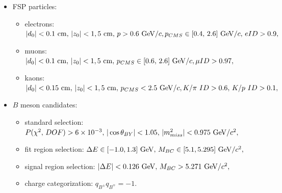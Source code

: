 \begin{itemize}
	\item FSP particles:
	\begin{itemize}
		\item electrons: $\vert d_0 \vert < 0.1\mathrm{~cm},\,\vert z_0 \vert < 1,5\mathrm{~cm},\,p>0.6\mathrm{~GeV}/c,\\p_{CMS}\in[0.4,\,2.6]\mathrm{~GeV}/c,\,eID>0.9,$
		\item muons: $\vert d_0 \vert < 0.1\mathrm{~cm},\,\vert z_0 \vert < 1,5\mathrm{~cm},\,p_{CMS}\in[0.6,\,2.6]\mathrm{~GeV}/c,\\\mu ID>0.97,$
		\item kaons: $\vert d_0 \vert < 0.15\mathrm{~cm},\,\vert z_0 \vert < 1,5\mathrm{~cm},\,p_{CMS} < 2.5\mathrm{~GeV}/c,\\K/\pi~ID>0.6,\,K/p~ID>0.1,$
	\end{itemize}
	\item $B$ meson candidates:
	\begin{itemize}
		\item standard selection: $P(\chi^2,\,DOF) > 6\times 10^{-3},\,\vert \cos \theta_{BY} \vert < 1.05,\,\vert m_{miss}^2\vert<0.975\mathrm{~GeV}/c^2,$
		\item fit region selection: $\Delta E \in [-1.0,1.3]\mathrm{~GeV},\,M_{BC} \in [5.1,5.295]\mathrm{~GeV}/c^2,$
		\item signal region selection: $\vert \Delta E \vert < 0.126\mathrm{~GeV},\,M_{BC} > 5.271\mathrm{~GeV}/c^2,$
		\item charge categorization: $q_{B^\pm}q_{B^\mp} = -1.$
	\end{itemize}
\end{itemize}